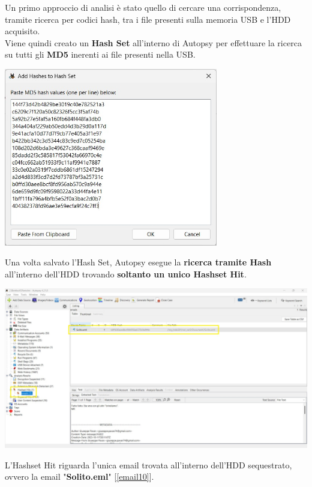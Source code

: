 Un primo approccio di analisi è stato quello di cercare una corrispondenza, tramite ricerca per codici hash, tra i file presenti sulla memoria USB e l'HDD acquisito.\vspace{14pt}\\
Viene quindi creato un \textbf{Hash Set} all'interno di Autopsy per effettuare la ricerca su tutti gli \textbf{MD5} inerenti ai file presenti nella USB.
\begin{center}
    \includegraphics[width=0.7\textwidth]{img/hash-list.jpeg}
\end{center}
Una volta salvato l'Hash Set, Autopsy esegue la \textbf{ricerca tramite Hash} all'interno dell'HDD trovando \textbf{soltanto un unico Hashset Hit}.
\begin{center}
    \includegraphics[width=1\textwidth]{img/hash-result.jpeg}
\end{center}
L'Hashset Hit riguarda l'unica email trovata all'interno dell'HDD sequestrato, ovvero la email "\textbf{Solito.eml}" [\ref{email10}].